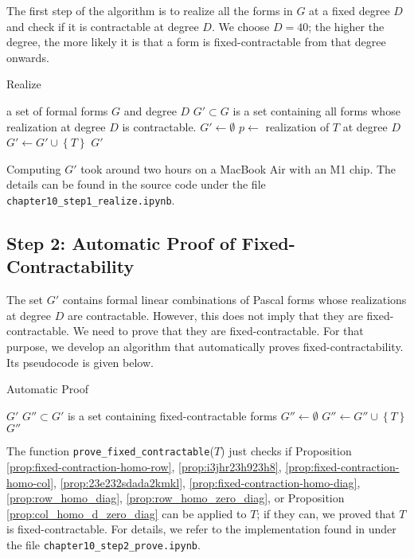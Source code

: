 The first step of the algorithm is to realize all the forms in \( G \) at a fixed degree \( D \) and check if it is contractable at degree \( D \). We choose \( D = 40 \); the higher the degree, the more likely it is that a form is fixed-contractable from that degree onwards. 


\begin{algorithm}[H]
    \caption{Realize}
    \label{alg:realize}
    \begin{algorithmic}[1]
    \Require a set of formal forms $G$ and degree \( D \)
\Ensure $G' \subset G$ is a set containing all forms whose realization at degree \( D \) is contractable.
    \State \( G' \gets \emptyset \)
        \State \( p \gets  \) realization of \( T \) at degree \( D \)
            \State $G' \gets G' \cup \left\{ T \right\}$
        \EndIf        
    \EndFor
    \State \Return $G'$
\EndFunction
\end{algorithmic}
\end{algorithm}

Computing \( G' \) took around two hours on a MacBook Air with an M1 chip. The details can be found in the source code \cite{ducrepo} under the file \texttt{chapter10\_step1\_realize.ipynb}.

\subsection*{Step 2: Automatic Proof of Fixed-Contractability}

The set \( G' \) contains formal linear combinations of Pascal forms whose realizations at degree \( D \) are contractable. However, this does not imply that they are fixed-contractable. We need to prove that they are fixed-contractable. For that purpose, we develop an algorithm that automatically proves fixed-contractability. Its pseudocode is given below.

\begin{algorithm}[H]
    \caption{Automatic Proof}
    \label{alg:autoproof}
    \begin{algorithmic}[1]
    \Require $G'$
\Ensure $G'' \subset G'$ is a set containing fixed-contractable forms
    \State \( G'' \gets \emptyset \)
            \State $G'' \gets G'' \cup \left\{ T \right\}$
        \EndIf        
    \EndFor
    \State \Return $G''$
\EndFunction
\end{algorithmic}
\end{algorithm}
The function \texttt{prove\_fixed\_contractable}($T$) just checks if Proposition \ref{prop:fixed-contraction-homo-row}, \ref{prop:i3jhr23h923h8}, \ref{prop:fixed-contraction-homo-col}, \ref{prop:23e232sdada2kmkl}, \ref{prop:fixed-contraction-homo-diag}, \ref{prop:row_homo_diag}, \ref{prop:row_homo_zero_diag}, or Proposition \ref{prop:col_homo_d_zero_diag} can be applied to \( T \); if they can, we proved that \( T \) is fixed-contractable. For details, we refer to the implementation found in \cite{ducrepo} under the file \texttt{chapter10\_step2\_prove.ipynb}. 


